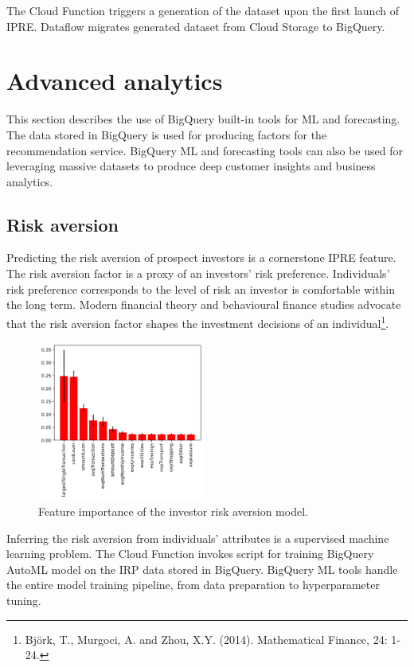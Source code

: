 \documentclass[twocolumn]{article}
\begin{document}
    The Cloud Function triggers a generation of the dataset upon the first launch of IPRE.
    Dataflow migrates generated dataset from Cloud Storage to BigQuery.

\section{Advanced analytics}
    This section describes the use of BigQuery built-in tools for ML and forecasting.
    The data stored in BigQuery is used for producing factors for the recommendation service.
    BigQuery ML and forecasting tools can also be used for leveraging massive datasets to produce deep customer insights and business analytics.

\subsection{Risk aversion}
    Predicting the risk aversion of prospect investors is a cornerstone IPRE feature.
    The risk aversion factor is a proxy of an investors' risk preference.
    Individuals' risk preference corresponds to the level of risk an investor is comfortable within the long term.
    Modern financial theory and behavioural finance studies advocate that the risk aversion factor shapes the investment decisions of an individual\footnote{Björk, T., Murgoci, A. and Zhou, X.Y. (2014). Mathematical Finance, 24: 1-24.}.

    \begin{figure}
        \includegraphics[width=0.49\textwidth]{media/irp-feature-importance.png}
        \caption{Feature importance of the investor risk aversion model.}
    \end{figure}

    Inferring the risk aversion from individuals' attributes is a supervised machine learning problem.
    The Cloud Function invokes script for training BigQuery AutoML model on the IRP data stored in BigQuery.
    BigQuery ML tools handle the entire model training pipeline, from data preparation to hyperparameter tuning.
\end{document}
